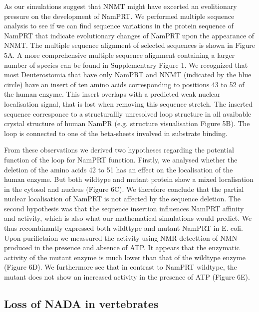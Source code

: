 As our simulations suggest that NNMT might have excerted an evolitionary pressure on the development of NamPRT. We performed multiple sequence analysis to see if we can find sequence variations in the protein sequence of NamPRT that indicate evolutionary changes of NamPRT upon the appearance of NNMT. The multiple sequence alignment of selected sequences is shown in Figure 5A. A more comprehensive multiple sequence alignment containing a larger number of species can be found in Supplementary Figure 1.  We recognized that most Deuterostomia that have only NamPRT and NNMT (indicated by the blue circle) have an insert of ten amino acids corresponding to positions 43 to 52 of the human enzyme. This insert overlaps with a predicted weak nuclear localisation signal, that is lost when removing this sequence stretch. The inserted sequence corresponce to a structurallly unresolved loop structure in all avaibable crystal structure of human NamPR (e.g. \cite{Wang2006} structure visualisation Figure 5B). The loop is connected to one of the beta-sheets involved in substrate binding.

From these observations we derived two hypotheses regarding the potential function of the loop for NamPRT function. Firstly, we analysed whether the deletion of the amino acids 42 to 51 has an effect on the localisation of the human enzyme. But both wildtype and mutant protein show a mixed localisation in the cytosol and nucleus (Figure 6C). We therefore conclude that the partial nuclear localisation of NamPRT is not affected by the sequence deletion.
The second hypothesis was that the sequence insertion influences NamPRT affinity and activity, which is also what our mathematical simulations would predict. We thus recombinantly expressed  both wildttype and mutant  NamPRT  in E. coli.  Upon purifictaion we meassured the activity using NMR detecttion of NMN produced in the presence and absence of ATP. It appears that the enzymatic activity of the mutant enzyme is much lower than that of the wildtype enzyme (Figure 6D). We furthermore see that in contrast to NamPRT wildtype, the mutant does not show an increased activity in the presence of ATP (Figure 6E). 

\subsection{Loss of NADA in vertebrates}

